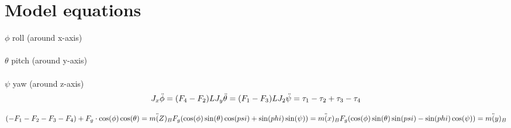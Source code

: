 \section{Model equations}
$\phi$ roll (around x-axis)\\ \\
$\theta$ pitch (around y-axis)\\ \\
$\psi$ yaw (around z-axis)\\

\begin{equation}
J_x\ddot{\phi}=(F_4-F_2)L\\
J_y \ddot{\theta}=(F_1-F_3)L\\
J_2\ddot{\psi}=\tau_1-\tau_2+\tau_3-\tau_4
\end{equation}

\begin{equation}
(-F_1-F_2-F_3-F_4)+F_g\cdot \cos(\phi)\cos(\theta)=m\ddot(Z)_B\\
F_g(\cos(\phi)\sin(\theta)\cos(psi)+\sin(phi)\sin(\psi))=m\ddot(x)_B\\
F_g(\cos(\phi)\sin(\theta)\sin(psi)-\sin(phi)\cos(\psi))=m\ddot(y)_B\\
\end{equation}